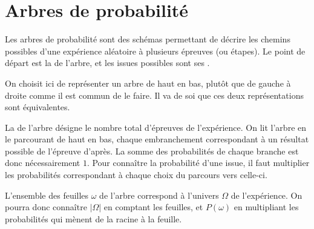 


\section{Arbres de probabilité}

Les arbres de probabilité sont des schémas permettant de décrire les chemins possibles d'une expérience aléatoire à plusieurs épreuves (ou étapes).
Le point de départ est la  de l'arbre, et les issues possibles sont ses .

On choisit ici de représenter un arbre de haut en bas, plutôt que de gauche à droite comme il est commun de le faire.
Il va de soi que ces deux représentations sont équivalentes.

La  de l'arbre désigne le nombre total d'épreuves de l'expérience.
On lit l'arbre en le parcourant de haut en bas, chaque embranchement correspondant à un résultat possible de l'épreuve d'après.
La somme des probabilités de chaque branche est donc nécessairement $1$.
Pour connaître la probabilité d'une issue, il faut multiplier les probabilités correspondant à chaque choix du parcours vers celle-ci.

L'ensemble des feuilles $\omega$ de l'arbre correspond à l'univers $\Omega$ de l'expérience.
On pourra donc connaître $|\Omega|$ en comptant les feuilles, et $P(\omega)$ en multipliant les probabilités qui mènent de la racine à la feuille.

